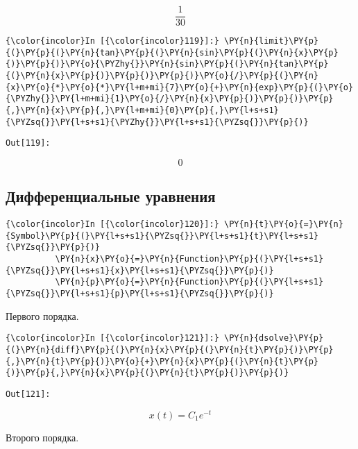     \[\frac{1}{30}\]

    

    \begin{Verbatim}[commandchars=\\\{\}]
{\color{incolor}In [{\color{incolor}119}]:} \PY{n}{limit}\PY{p}{(}\PY{p}{(}\PY{n}{tan}\PY{p}{(}\PY{n}{sin}\PY{p}{(}\PY{n}{x}\PY{p}{)}\PY{p}{)}\PY{o}{\PYZhy{}}\PY{n}{sin}\PY{p}{(}\PY{n}{tan}\PY{p}{(}\PY{n}{x}\PY{p}{)}\PY{p}{)}\PY{p}{)}\PY{o}{/}\PY{p}{(}\PY{n}{x}\PY{o}{*}\PY{o}{*}\PY{l+m+mi}{7}\PY{o}{+}\PY{n}{exp}\PY{p}{(}\PY{o}{\PYZhy{}}\PY{l+m+mi}{1}\PY{o}{/}\PY{n}{x}\PY{p}{)}\PY{p}{)}\PY{p}{,}\PY{n}{x}\PY{p}{,}\PY{l+m+mi}{0}\PY{p}{,}\PY{l+s+s1}{\PYZsq{}}\PY{l+s+s1}{\PYZhy{}}\PY{l+s+s1}{\PYZsq{}}\PY{p}{)}
\end{Verbatim}
\texttt{\color{outcolor}Out[{\color{outcolor}119}]:}
    
    \[0\]

    

\subsection{Дифференциальные уравнения}
\label{sympy11}

    \begin{Verbatim}[commandchars=\\\{\}]
{\color{incolor}In [{\color{incolor}120}]:} \PY{n}{t}\PY{o}{=}\PY{n}{Symbol}\PY{p}{(}\PY{l+s+s1}{\PYZsq{}}\PY{l+s+s1}{t}\PY{l+s+s1}{\PYZsq{}}\PY{p}{)}
          \PY{n}{x}\PY{o}{=}\PY{n}{Function}\PY{p}{(}\PY{l+s+s1}{\PYZsq{}}\PY{l+s+s1}{x}\PY{l+s+s1}{\PYZsq{}}\PY{p}{)}
          \PY{n}{p}\PY{o}{=}\PY{n}{Function}\PY{p}{(}\PY{l+s+s1}{\PYZsq{}}\PY{l+s+s1}{p}\PY{l+s+s1}{\PYZsq{}}\PY{p}{)}
\end{Verbatim}

    Первого порядка.

    \begin{Verbatim}[commandchars=\\\{\}]
{\color{incolor}In [{\color{incolor}121}]:} \PY{n}{dsolve}\PY{p}{(}\PY{n}{diff}\PY{p}{(}\PY{n}{x}\PY{p}{(}\PY{n}{t}\PY{p}{)}\PY{p}{,}\PY{n}{t}\PY{p}{)}\PY{o}{+}\PY{n}{x}\PY{p}{(}\PY{n}{t}\PY{p}{)}\PY{p}{,}\PY{n}{x}\PY{p}{(}\PY{n}{t}\PY{p}{)}\PY{p}{)}
\end{Verbatim}
\texttt{\color{outcolor}Out[{\color{outcolor}121}]:}
    
    \[x{\left (t \right )} = C_{1} e^{- t}\]

    

    Второго порядка.

